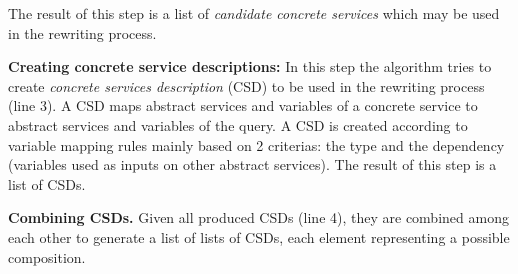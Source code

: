 The result of this step is a list of \textit{candidate concrete services} which
may be used in the rewriting process.


\noindent \textbf{Creating concrete service descriptions:} In this step  the
 algorithm tries to create \textit{concrete services description} (CSD) to be
 used in the rewriting process (line 3). A CSD maps abstract services and
 variables of a concrete service to abstract services and variables of the
 query. A CSD is created 
according to variable mapping rules mainly based on 2 criterias: the type and the dependency (variables used as inputs on other abstract services). 
The  result of this step is a list of CSDs.
  

 
\noindent \textbf{Combining CSDs.} Given all produced CSDs  (line
4), they are combined among each other to generate  a list of lists of CSDs, each element representing a possible composition.

